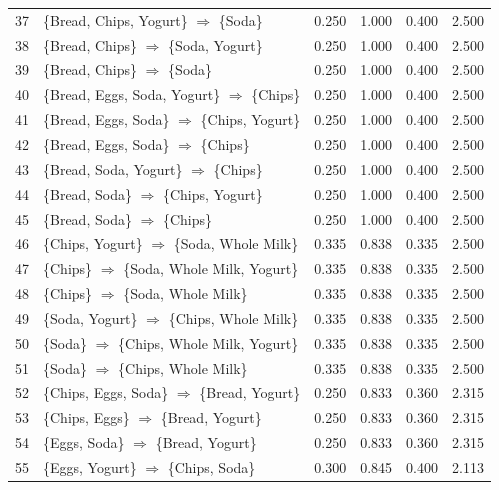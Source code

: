 \documentclass[12pt,letterpaper, onecolumn]{exam}
\begin{document}
\begin{questions}
\begin{solution}
{\begin{longtable}{|c|l|c|c|c|c|}
            37 & \{Bread, Chips, Yogurt\} $\Rightarrow$ \{Soda\} & 0.250 & 1.000 & 0.400 & 2.500 \\
            38 & \{Bread, Chips\} $\Rightarrow$ \{Soda, Yogurt\} & 0.250 & 1.000 & 0.400 & 2.500 \\
            39 & \{Bread, Chips\} $\Rightarrow$ \{Soda\} & 0.250 & 1.000 & 0.400 & 2.500 \\
            40 & \{Bread, Eggs, Soda, Yogurt\} $\Rightarrow$ \{Chips\} & 0.250 & 1.000 & 0.400 & 2.500 \\
            41 & \{Bread, Eggs, Soda\} $\Rightarrow$ \{Chips, Yogurt\} & 0.250 & 1.000 & 0.400 & 2.500 \\
            42 & \{Bread, Eggs, Soda\} $\Rightarrow$ \{Chips\} & 0.250 & 1.000 & 0.400 & 2.500 \\
            43 & \{Bread, Soda, Yogurt\} $\Rightarrow$ \{Chips\} & 0.250 & 1.000 & 0.400 & 2.500 \\
            44 & \{Bread, Soda\} $\Rightarrow$ \{Chips, Yogurt\} & 0.250 & 1.000 & 0.400 & 2.500 \\
            45 & \{Bread, Soda\} $\Rightarrow$ \{Chips\} & 0.250 & 1.000 & 0.400 & 2.500 \\
            46 & \{Chips, Yogurt\} $\Rightarrow$ \{Soda, Whole Milk\} & 0.335 & 0.838 & 0.335 & 2.500 \\
            47 & \{Chips\} $\Rightarrow$ \{Soda, Whole Milk, Yogurt\} & 0.335 & 0.838 & 0.335 & 2.500 \\
            48 & \{Chips\} $\Rightarrow$ \{Soda, Whole Milk\} & 0.335 & 0.838 & 0.335 & 2.500 \\
            49 & \{Soda, Yogurt\} $\Rightarrow$ \{Chips, Whole Milk\} & 0.335 & 0.838 & 0.335 & 2.500 \\
            50 & \{Soda\} $\Rightarrow$ \{Chips, Whole Milk, Yogurt\} & 0.335 & 0.838 & 0.335 & 2.500 \\
            51 & \{Soda\} $\Rightarrow$ \{Chips, Whole Milk\} & 0.335 & 0.838 & 0.335 & 2.500 \\
            52 & \{Chips, Eggs, Soda\} $\Rightarrow$ \{Bread, Yogurt\} & 0.250 & 0.833 & 0.360 & 2.315 \\
            53 & \{Chips, Eggs\} $\Rightarrow$ \{Bread, Yogurt\} & 0.250 & 0.833 & 0.360 & 2.315 \\
            54 & \{Eggs, Soda\} $\Rightarrow$ \{Bread, Yogurt\} & 0.250 & 0.833 & 0.360 & 2.315 \\
            55 & \{Eggs, Yogurt\} $\Rightarrow$ \{Chips, Soda\} & 0.300 & 0.845 & 0.400 & 2.113 \\

\end{longtable}}
\end{solution}
\end{questions}
\end{document}
